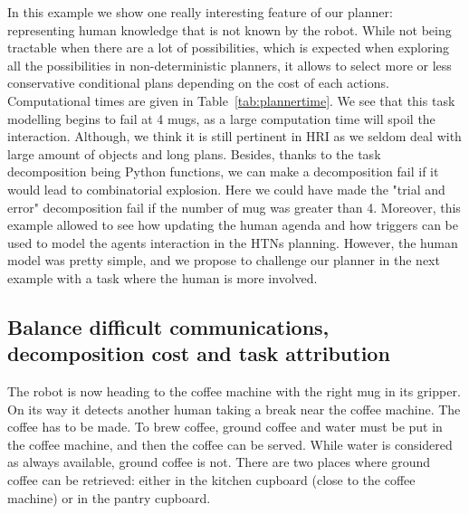 \documentclass[a4paper,11pt,twoside]{StyleThese}
\begin{document}
In this example we show one really interesting feature of our planner: representing human knowledge that is not known by the robot. While not being tractable when there are a lot of possibilities, which is expected when exploring all the possibilities in non-deterministic planners, it allows to select more or less conservative conditional plans depending on the cost of each actions. Computational times are given in Table~\ref{tab:plannertime}. We see that this task modelling begins to fail at 4 mugs, as a large computation time will spoil the interaction. Although, we think it is still pertinent in HRI as we seldom deal with large amount of objects and long plans. Besides, thanks to the task decomposition being Python functions, we can make a decomposition fail if it would lead to combinatorial explosion. Here we could have made the "trial and error" decomposition fail if the number of mug was greater than 4. Moreover, this example allowed to see how updating the human agenda and how triggers can be used to model the agents interaction in the HTNs planning.
However, the human model was pretty simple, and we propose to challenge our planner in the next example with a task where the human is more involved.

\subsection{Balance difficult communications, decomposition cost and task attribution}
The robot is now heading to the coffee machine with the right mug in its gripper. On its way it detects another human taking a break near the coffee machine. The coffee has to be made. To brew coffee, ground coffee and water must be put in the coffee machine, and then the coffee can be served. While water is considered as always available, ground coffee is not. There are two places where ground coffee can be retrieved: either in the kitchen cupboard (close to the coffee machine) or in the pantry cupboard. 
\end{document}
